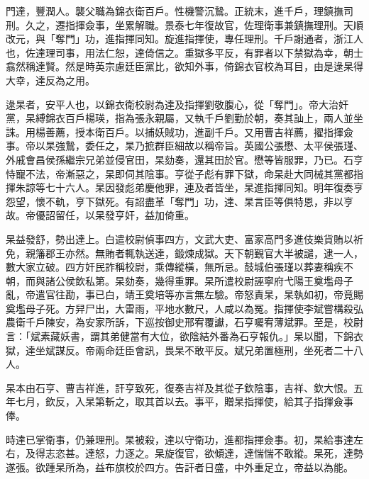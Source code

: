 \begin{pinyinscope}
門達，豐潤人。襲父職為錦衣衛百戶。性機警沉鷙。正統末，進千戶，理鎮撫司刑。久之，遷指揮僉事，坐累解職。景泰七年復故官，佐理衛事兼鎮撫理刑。天順改元，與「奪門」功，進指揮同知。旋進指揮使，專任理刑。千戶謝通者，浙江人也，佐達理司事，用法仁恕，達倚信之。重獄多平反，有罪者以下禁獄為幸，朝士翕然稱達賢。然是時英宗慮廷臣黨比，欲知外事，倚錦衣官校為耳目，由是逯杲得大幸，達反為之用。

逯杲者，安平人也，以錦衣衛校尉為達及指揮劉敬腹心，從「奪門」。帝大治奸黨，杲縛錦衣百戶楊瑛，指為張永親屬，又執千戶劉勤於朝，奏其訕上，兩人並坐誅。用楊善薦，授本衛百戶。以捕妖賊功，進副千戶。又用曹吉祥薦，擢指揮僉事。帝以杲強鷙，委任之，杲乃摭群臣細故以稱帝旨。英國公張懋、太平侯張瑾、外戚會昌侯孫繼宗兄弟並侵官田，杲劾奏，還其田於官。懋等皆服罪，乃已。石亨恃寵不法，帝漸惡之，杲即伺其陰事。亨從子彪有罪下獄，命杲赴大同械其黨都指揮朱諒等七十六人。杲因發彪弟慶他罪，連及者皆坐，杲進指揮同知。明年復奏亨怨望，懷不軌，亨下獄死。有詔盡革「奪門」功，達、杲言臣等俱特恩，非以亨故。帝優詔留任，以杲發亨奸，益加倚重。

杲益發舒，勢出達上。白遣校尉偵事四方，文武大吏、富家高門多進伎樂貨賄以祈免，親籓郡王亦然。無賄者輒執送達，鍛煉成獄。天下朝覲官大半被譴，逮一人，數大家立破。四方奸民詐稱校尉，乘傳縱橫，無所忌。鼓城伯張瑾以葬妻稱疾不朝，而與諸公侯飲私第。杲劾奏，幾得重罪。杲所遣校尉誣寧府弋陽王奠壏母子亂，帝遣官往勘，事已白，靖王奠培等亦言無左驗。帝怒責杲，杲執如初，帝竟賜奠壏母子死。方舁尸出，大雷雨，平地水數尺，人咸以為冤。指揮使李斌嘗構殺弘農衛千戶陳安，為安家所訴，下巡按御史邢宥覆讞，石亨囑宥薄斌罪。至是，校尉言：「斌素藏妖書，謂其弟健當有大位，欲陰結外番為石亨報仇。」杲以聞，下錦衣獄，達坐斌謀反。帝兩命廷臣會訊，畏杲不敢平反。斌兄弟置極刑，坐死者二十八人。

杲本由石亨、曹吉祥進，訐亨致死，復奏吉祥及其從子欽陰事，吉祥、欽大恨。五年七月，欽反，入杲第斬之，取其首以去。事平，贈杲指揮使，給其子指揮僉事俸。

時達已掌衛事，仍兼理刑。杲被殺，達以守衛功，進都指揮僉事。初，杲給事達左右，及得志恣甚。達怒，力逐之。杲旋復官，欲傾達，達惴惴不敢縱。杲死，達勢遂張。欲踵杲所為，益布旗校於四方。告訐者日盛，中外重足立，帝益以為能。


\end{pinyinscope}
